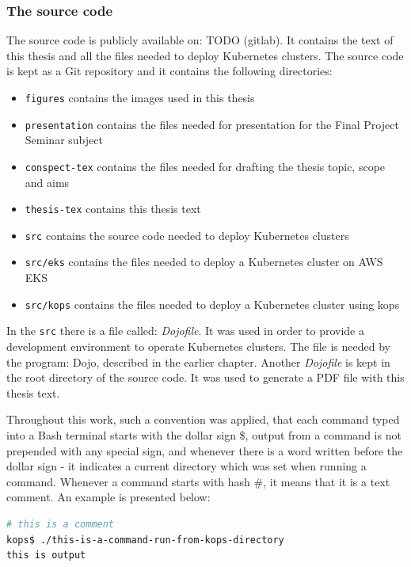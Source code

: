 \subsubsection{The source code}
\label{5-sc}
The source code is publicly available on: TODO (gitlab). It contains the text of this thesis and all the files needed to deploy Kubernetes clusters. The source code is kept as a Git repository and it contains the following directories:
\begin{itemize}
\item \verb|figures| contains the images used in this thesis
\item \verb|presentation| contains the files needed for presentation for the Final Project Seminar subject
\item \verb|conspect-tex| contains the files needed for drafting the thesis topic, scope and aims
\item \verb|thesis-tex| contains this thesis text
\item \verb|src| contains the source code needed to deploy Kubernetes clusters
\item \verb|src/eks| contains the files needed to deploy a Kubernetes cluster on AWS EKS
\item \verb|src/kops| contains the files needed to deploy a Kubernetes cluster using kops
\end{itemize}

In the \verb|src| there is a file called: \textit{Dojofile}. It was used in order to provide a development environment to operate Kubernetes clusters. The file is needed by the program: Dojo, described in the earlier chapter. Another \textit{Dojofile} is kept in the root directory of the source code. It was used to generate a PDF file with this thesis text.

Throughout this work, such a convention was applied, that each command typed into a Bash terminal starts with the dollar sign \$, output from a command is not prepended with any special sign, and whenever there is a word written before the dollar sign - it indicates a current directory which was set when running a command. Whenever a command starts with hash \#, it means that it is a text comment. An example is presented below:
\begin{lstlisting}[basicstyle=\tiny,caption={An example code listing explaining the format},captionpos=b,language=Bash,xleftmargin=1cm]
# this is a comment
kops$ ./this-is-a-command-run-from-kops-directory
this is output
\end{lstlisting}

